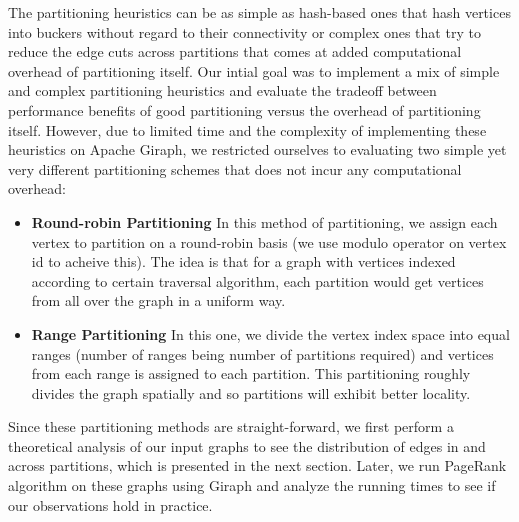 The partitioning heuristics can be as simple as hash-based ones that hash vertices into buckers 
without regard to their connectivity or complex ones that try to reduce the edge cuts across partitions 
\cite{Salihoglu1} that comes at added computational overhead of partitioning itself. Our intial goal 
was to implement a mix of simple and complex partitioning heuristics and evaluate the tradeoff between
performance benefits of good partitioning versus the overhead of partitioning itself. However, due to 
limited time and the complexity of implementing these heuristics on Apache Giraph, we restricted 
ourselves to evaluating two simple yet very different partitioning schemes that does not incur any 
computational overhead:
\begin{itemize}
    \item \textbf{Round-robin Partitioning} In this method of partitioning, we assign each vertex to 
    partition on a round-robin basis (we use modulo operator on vertex id to acheive this). The idea 
    is that for a graph with vertices indexed according to certain traversal algorithm, each partition 
    would get vertices from all over the graph in a uniform way.
    \item \textbf{Range Partitioning} In this one, we divide the vertex index space into equal ranges
    (number of ranges being number of partitions required) and vertices from each range is assigned to 
    each partition. This partitioning roughly divides the graph spatially and so partitions will exhibit 
    better locality.
\end{itemize}

Since these partitioning methods are straight-forward, we first perform a theoretical analysis of our 
input graphs to see the distribution of edges in and across partitions, which is presented in the 
next section. Later, we run PageRank 
algorithm on these graphs using Giraph and analyze the running times to see if our observations 
hold in practice.





